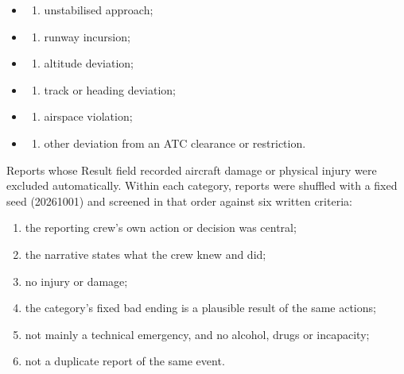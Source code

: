 \documentclass[11pt]{article}
\providecommand{\tightlist}{\setlength{\itemsep}{0pt}\setlength{\parskip}{0pt}}
\begin{document}
\begin{itemize}
\item
  \begin{enumerate}
  \def\labelenumi{(\Alph{enumi})}
  \tightlist
  \item
    unstabilised approach;
  \end{enumerate}
\item
  \begin{enumerate}
  \def\labelenumi{(\Alph{enumi})}
  \setcounter{enumi}{1}
  \tightlist
  \item
    runway incursion;
  \end{enumerate}
\item
  \begin{enumerate}
  \def\labelenumi{(\Alph{enumi})}
  \setcounter{enumi}{2}
  \tightlist
  \item
    altitude deviation;
  \end{enumerate}
\item
  \begin{enumerate}
  \def\labelenumi{(\Alph{enumi})}
  \setcounter{enumi}{3}
  \tightlist
  \item
    track or heading deviation;
  \end{enumerate}
\item
  \begin{enumerate}
  \def\labelenumi{(\Alph{enumi})}
  \setcounter{enumi}{4}
  \tightlist
  \item
    airspace violation;
  \end{enumerate}
\item
  \begin{enumerate}
  \def\labelenumi{(\Alph{enumi})}
  \setcounter{enumi}{5}
  \tightlist
  \item
    other deviation from an ATC clearance or restriction.
  \end{enumerate}
\end{itemize}

Reports whose Result field recorded aircraft damage or physical injury were excluded automatically. Within each category, reports were shuffled with a fixed seed (20261001) and screened in that order against six written criteria:

\begin{enumerate}
\def\labelenumi{\arabic{enumi}.}
\tightlist
\item
  the reporting crew's own action or decision was central;
\item
  the narrative states what the crew knew and did;
\item
  no injury or damage;
\item
  the category's fixed bad ending is a plausible result of the same actions;
\item
  not mainly a technical emergency, and no alcohol, drugs or incapacity;
\item
  not a duplicate report of the same event.
\end{enumerate}
\end{document}
